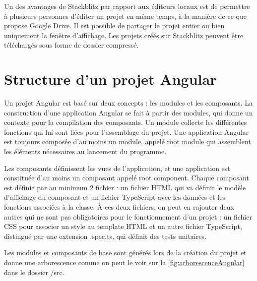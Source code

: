\documentclass{polytech/polytech}
\begin{document}
Un des avantages de Stackblitz par rapport aux éditeurs locaux est de permettre à plusieurs personnes d’éditer un projet en même temps, à la manière de ce que propose Google Drive. Il est possible de partager le projet entier ou bien uniquement la fenêtre d’affichage. Les projets créés sur Stackblitz peuvent être téléchargés sous forme de dossier compressé. 

\section{Structure d'un projet Angular}

Un projet Angular est basé sur deux concepts : les modules et les composants. La construction d’une application Angular se fait à partir des modules, qui donne un contexte pour la compilation des composants. Un module collecte les différentes fonctions qui lui sont liées pour l’assemblage du projet. Une application Angular est toujours composée d’au moins un module, appelé root module qui assemblent les éléments nécessaires au lancement du programme. 

Les composants définissent les vues de l’application, et une application est constituée d’au moins un composant appelé root component. Chaque composant est définie par au minimum 2 fichier : un fichier HTML qui va définir le modèle d’affichage du composant et un fichier TypeScript avec les données et les fonctions associées à la classe. À ces deux fichiers, on peut en rajouter deux autres qui ne sont pas obligatoires pour le fonctionnement d’un projet : un fichier CSS pour associer un style au template HTML et un autre fichier TypeScript, distingué par une extension .spec.ts, qui définit des tests unitaires.

Les modules et composants de base sont générés lors de la création du projet et donne une arborescence comme on peut le voir sur la \autoref{fig:arborescenceAngular} dans le dossier /src.
\end{document}
